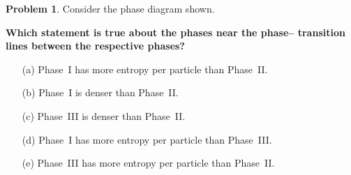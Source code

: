 \documentclass[10pt]{article}
\theoremstyle{definition} %
\newtheorem{problem}{Problem}
\theoremstyle{plain} %
\begin{document}
\begin{problem}

    \begin{minipage}[t]{0.44\linewidth}
      \centering
    \end{minipage}
    \hfill
      Consider the phase diagram shown.
  
      \medskip
      \textbf{Which statement is true about the phases near the phase–
      transition lines between the respective phases?}
      \begin{enumerate}
        \item[(a)] Phase~I has more entropy per particle than Phase~II.
        \item[(b)] Phase~I is denser than Phase~II.
        \item[(c)] Phase~III is denser than Phase~II.
        \item[(d)] Phase~I has more entropy per particle than Phase~III.
        \item[(e)] Phase~III has more entropy per particle than Phase~II.
      \end{enumerate}
  \end{problem}
\pagebreak                                                        
\end{document}
